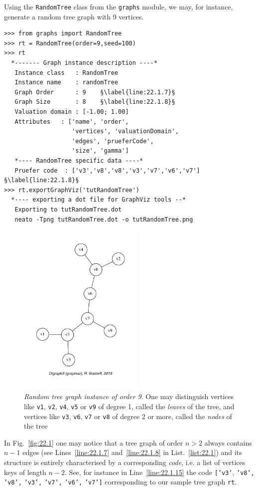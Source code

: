 Using the \texttt{RandomTree} class from the \texttt{graphs} module, we may, for instance, generate a random tree graph with 9 vertices.
\begin{lstlisting}[caption={Generating a random tree graph},label=list:22.1]
>>> from graphs import RandomTree
>>> rt = RandomTree(order=9,seed=100)
>>> rt
  *------- Graph instance description ----*
   Instance class   : RandomTree
   Instance name    : randomTree
   Graph Order      : 9    §\label{line:22.1.7}§
   Graph Size       : 8    §\label{line:22.1.8}§
   Valuation domain : [-1.00; 1.00]
   Attributes   : ['name', 'order',
                   'vertices', 'valuationDomain',
                   'edges', 'prueferCode',
                   'size', 'gamma']
   *---- RandomTree specific data ----*
   Pruefer code  : ['v3','v8','v8','v3','v7','v6','v7'] §\label{line:22.1.8}§
>>> rt.exportGraphViz('tutRandomTree')
  *---- exporting a dot file for GraphViz tools --*
   Exporting to tutRandomTree.dot
   neato -Tpng tutRandomTree.dot -o tutRandomTree.png
\end{lstlisting}
\begin{figure}[ht]
\sidecaption[t]
\includegraphics[width=6cm]{Figures/22-1-tutRandomTree.pdf}
\caption[Random tree graph instance of order 9]{\emph{Random tree graph instance of order 9}. One may distinguish vertices like \texttt{v1}, \texttt{v2}, \texttt{v4}, \texttt{v5} or \texttt{v9}  of degree 1, called the \emph{leaves} of the tree, and vertices like \texttt{v3}, \texttt{v6}, \texttt{v7} or \texttt{v8} of degree 2 or more, called the \emph{nodes} of the tree} 
\label{fig:22.1}       %
\end{figure}

In Fig.~\vref{fig:22.1} one may notice that a tree graph of order $n > 2$ always contains $n-1$ edges (see Lines~\ref{line:22.1.7} and~\ref{line:22.1.8} in List.~\vref{list:22.1}) and its structure is entirely characterised by a corresponding \Pruefer \emph{code}, i.e. a list of vertices keys of length $n-2$. See, for instance in Line~\ref{line:22.1.15} the code \texttt{['v3'}, \texttt{'v8',} \texttt{'v8',} \texttt{'v3',} \texttt{'v7',} \texttt{'v6',} \texttt{'v7']} corresponding to our sample tree graph \texttt{rt}.


